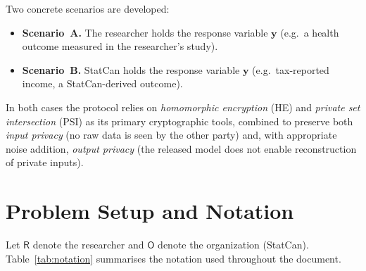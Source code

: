 \documentclass[12pt]{article}
\theoremstyle{definition}
\theoremstyle{plain}
\newcommand{\by}{\mathbf{y}}
\newcommand{\Party}[1]{\textsf{#1}}
\begin{document}
Two concrete scenarios are developed:
\begin{itemize}[noitemsep]
  \item \textbf{Scenario~A.} The researcher holds the response variable $\by$ (e.g.\ a health outcome measured in the researcher's study).
  \item \textbf{Scenario~B.} StatCan holds the response variable $\by$ (e.g.\ tax-reported income, a StatCan-derived outcome).
\end{itemize}

In both cases the protocol relies on \emph{homomorphic encryption} (HE) and \emph{private set intersection} (PSI) as its primary cryptographic tools, combined to preserve both \emph{input privacy} (no raw data is seen by the other party) and, with appropriate noise addition, \emph{output privacy} (the released model does not enable reconstruction of private inputs).

\section{Problem Setup and Notation}

Let $\Party{R}$ denote the researcher and $\Party{O}$ denote the organization (StatCan). Table~\ref{tab:notation} summarises the notation used throughout the document.
\end{document}
